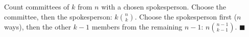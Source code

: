 Count committees of $k$ from $n$ with a chosen spokesperson. Choose the committee, then the spokesperson: $k\binom nk$. Choose the spokesperson first ($n$ ways), then the other $k-1$ members from the remaining $n-1$: $n\binom{n-1}{k-1}$. $\blacksquare$
